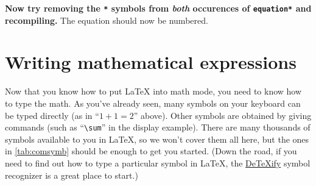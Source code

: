 \documentclass{article}
\newcommand*{\code}[1]{\texttt{#1}}
\newcommand*{\inst}[1]{\textbf{#1}}
\begin{document}
\inst{Now try removing the \code{*} symbols from \emph{both} occurences of \code{equation*} and recompiling.}
The equation should now be numbered.

\section{Writing mathematical expressions}
Now that you know how to put \LaTeX{} into math mode, you need to know how to type the math.
As you've already seen, many symbols on your keyboard can be typed directly (as in \enquote{$1 + 1 = 2$} above).
Other symbols are obtained by giving commands (such as \enquote{\code{\textbackslash{}sum}} in the display example).
There are many thousands of symbols available to you in \LaTeX{}, so we won't cover them all here, but the ones in \cref{tab:comsymb} should be enough to get you started.
(Down the road, if you need to find out how to type a particular symbol in \LaTeX{}, the \href{http://detexify.kirelabs.org/classify.html}{De\TeX{}ify} symbol recognizer is a great place to start.)
\end{document}
